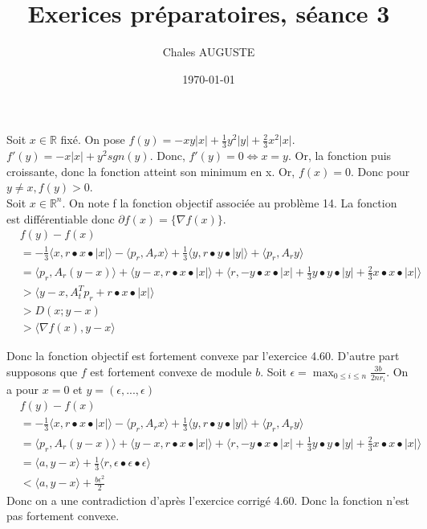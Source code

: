 \documentclass[12pt, letterpaper]{article}
\title{Exerices préparatoires, séance 3}
\author{Chales AUGUSTE}
\date{\today}
\newcommand{\R}{\mathbb{R}^n}
\begin{document}
Soit $x\in \mathbb{R}$ fixé. On pose $f(y) = -x y |x| + \frac{1}{3} y^2 |y| + \frac{2}{3} x^2 |x|$.
 $f'(y) = -x |x| + y^2 sgn(y)$. Donc, $f'(y) = 0 \Leftrightarrow x = y$. Or, la fonction puis croissante, donc la fonction atteint son minimum en x. Or, $f(x) = 0$. Donc pour $y \neq x, f(y) > 0
$. \\

Soit $x\in\R$. On note f la fonction objectif associée au problème 14. La fonction est différentiable donc $\partial f(x) = \{\nabla f(x)\}$. 
\begin{align*}
&f(y) - f(x) \\
&= -\frac{1}{3} \langle x,r \bullet x \bullet |x|\rangle  - \langle p_r,A_rx\rangle  + \frac{1}{3}\langle y,r \bullet y \bullet |y|\rangle  + \langle p_r,A_ry\rangle   \\
&= \langle p_r,A_r(y - x)\rangle  + \langle y-x, r \bullet x \bullet |x|\rangle  + \langle r, -y \bullet x \bullet |x| + \frac{1}{3}y \bullet y \bullet |y| + \frac{2}{3}x \bullet x \bullet |x|\rangle \\
&>  \langle y-x,A_t^Tp_r + r \bullet x \bullet |x|\rangle  \tag{les termes que l'on a enlevé étaient positifs par le lemme ci-dessus} \\
&>  D(x;y-x)\\
&>  \langle \nabla f(x),y-x\rangle 
\end{align*}

Donc la fonction objectif est fortement convexe par l'exercice 4.60. 
D'autre part supposons que $f$ est fortement convexe de module $b$. Soit $\epsilon =  \max_{0\leq i \leq n} \frac{3b}{2nr_i}$. On a pour $x = 0$ et $y = (\epsilon,...,\epsilon)$
\begin{align*}
&f(y) - f(x) \\
&= -\frac{1}{3} \langle x,r \bullet x \bullet |x|\rangle  - \langle p_r,A_rx\rangle  + \frac{1}{3}\langle y,r \bullet y \bullet |y|\rangle  + \langle p_r,A_ry\rangle   \\
&= \langle p_r,A_r(y - x)\rangle  + \langle y-x, r \bullet x \bullet |x|\rangle  + \langle r, -y \bullet x \bullet |x| + \frac{1}{3}y \bullet y \bullet |y| + \frac{2}{3}x \bullet x \bullet |x|\rangle \\
&= \langle a,y-x\rangle   + \frac{1}{3}\langle r, \epsilon \bullet \epsilon \bullet \epsilon\rangle  \\
&<  \langle a,y-x\rangle  + \frac{b \epsilon^2}{2}
\end{align*}
Donc on a une contradiction d'après l'exercice corrigé 4.60. Donc la fonction n'est pas fortement convexe.
\end{document}
